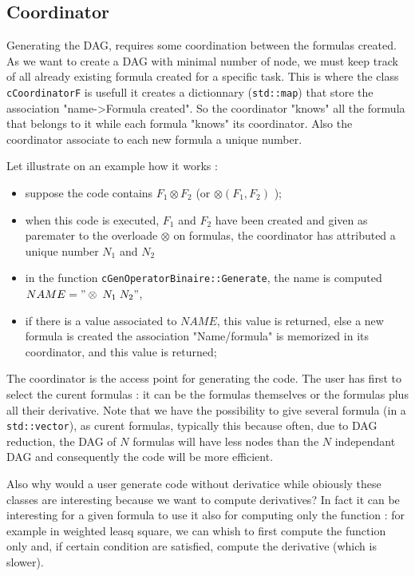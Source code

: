 
\subsection{Coordinator}

Generating the DAG, requires some coordination between the formulas created.
As we want to create a DAG with  minimal number of node, we must keep track
of all already existing formula created for a specific task.
This is where the class {\tt cCoordinatorF} is usefull  it creates a dictionnary ({\tt std::map})
that store the association "name->Formula created".  So the coordinator "knows" all the 
formula that belongs to it while each formula "knows" its coordinator. Also the coordinator
associate to each new formula a unique number.

Let illustrate on an example how it works :

\begin{itemize}
	\item  suppose the code contains  $F_1\otimes F_2$  (or  $\otimes(F_1,F_2)$ );
	\item  when this code is executed, $F_1$ and $F_2$ have been created and given as
		paremater to the overloade  $\otimes $ on formulas, the coordinator has
		attributed a unique number $N_1$ and $N_2$
	\item  in the function {\tt cGenOperatorBinaire::Generate}, the name is computed $NAME="\otimes \; N_1 \; N_2" $,
	\item  if there is a value associated to $NAME$, this value is returned, else a new formula is created 
	       the association "Name/formula" is memorized in its coordinator, and this value is returned;
\end{itemize}

The coordinator  is the access point for generating the code. The user has first to select the curent formulas :
it can be the formulas themselves or the formulas plus all their derivative.
Note that we have the possibility to give several formula (in a {\tt std::vector}), as curent formulas,
typically this because often, due to DAG reduction,  the  DAG of $N$ formulas will have less nodes
than the $N$ independant DAG and consequently the code will be more efficient.

Also why would a user generate code without derivatice while
obiously these classes are interesting because we want to compute derivatives? 
In fact  it can be interesting for a given formula to use it also for 
computing  only the function : for example in weighted leasq square, we can whish to first compute the function
only and, if certain condition are satisfied, compute the derivative (which is slower).

